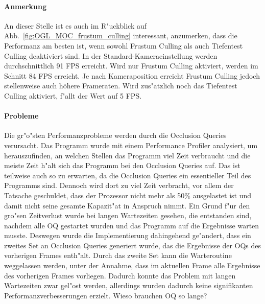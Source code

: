 \documentclass[journal]{vgtc}
\begin{document}
\paragraph{Anmerkung} An dieser Stelle ist es auch im R"uckblick auf Abb.\ \ref{fig:OGL_MOC_frustum_culling} interessant, anzumerken, dass die Performanz am besten ist, wenn sowohl Frustum Culling als auch Tiefentest Culling deaktiviert sind. In der Standard-Kameraeinstellung werden durchschnittlich 91 FPS erreicht. Wird nur Frustum Culling aktiviert, werden im Schnitt 84 FPS erreicht.
Je nach Kameraposition erreicht Frustum Culling jedoch stellenweise auch höhere Frameraten.
Wird zus"atzlich noch das Tiefentest Culling aktiviert, f"allt der Wert auf 5 FPS.\\

\paragraph{Probleme} Die gr"o"sten Performanzprobleme werden durch die Occlusion Queries verursacht.
Das Programm wurde mit einem Performance Profiler analysiert, um herauszufinden, an welchen Stellen das Programm viel Zeit verbraucht und die meiste Zeit h"alt sich das Programm bei den Occlusion Queries auf.
Das ist teilweise auch so zu erwarten, da die Occlusion Queries ein essentieller Teil des Programms sind. Dennoch wird dort zu viel Zeit verbracht, vor allem der Tatsache geschuldet, dass der Prozessor nicht mehr als 50\% ausgelastet ist und damit nicht seine gesamte Kapazit"at in Anspruch nimmt.
Ein Grund f"ur den gro"sen Zeitverlust wurde bei langen Wartezeiten gesehen, die entstanden sind, nachdem alle OQ gestartet wurden und das Programm auf die Ergebnisse warten musste.
Deswegen wurde die Implementierung dahingehend ge"andert, dass ein zweites Set an Occlusion Queries generiert wurde, das die Ergebnisse der OQs des vorherigen Frames enth"alt.
Durch das zweite Set kann die Warteroutine weggelassen werden, unter der Annahme, dass im aktuellen Frame alle Ergebnisse des vorherigen Frames vorliegen.
Dadurch konnte das Problem mit langen Wartezeiten zwar gel"ost werden, allerdings wurden dadurch keine signifikanten Performanzverbesserungen erzielt.
Wieso brauchen OQ so lange?
\end{document}
